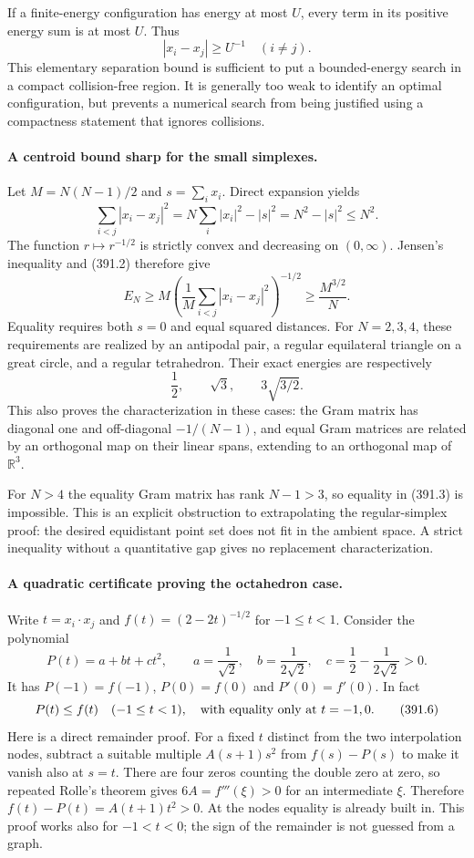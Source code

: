\documentclass[11pt]{article}
\begin{document}
If a finite-energy configuration has energy at most $U$, every term
in its positive energy sum is at most $U$. Thus
\[
 |x_i-x_j|\geq U^{-1}\quad(i\ne j).
 \tag{391.1}
\]
This elementary separation bound is sufficient to put a bounded-energy
search in a compact collision-free region. It is generally too weak
to identify an optimal configuration, but prevents a numerical search
from being justified using a compactness statement that ignores
collisions.

\paragraph{A centroid bound sharp for the small simplexes.}
Let $M=N(N-1)/2$ and $s=\sum_i x_i$. Direct expansion yields
\[
 \sum_{i<j}|x_i-x_j|^2=N\sum_i|x_i|^2-|s|^2=N^2-|s|^2\leq N^2.
 \tag{391.2}
\]
The function $r\mapsto r^{-1/2}$ is strictly convex and decreasing
on $(0,\infty)$. Jensen's inequality and (391.2) therefore give
\[
 E_N\geq M\left(\frac1M\sum_{i<j}|x_i-x_j|^2\right)^{-1/2}
     \geq\frac{M^{3/2}}N.
 \tag{391.3}
\]
Equality requires both $s=0$ and equal squared distances. For
$N=2,3,4$, these requirements are realized by an antipodal pair,
a regular equilateral triangle on a great circle, and a regular
tetrahedron. Their exact energies are respectively
\[
 \frac12,\qquad\sqrt3,\qquad 3\sqrt{3/2}.
 \tag{391.4}
\]
This also proves the characterization in these cases: the Gram matrix
has diagonal one and off-diagonal $-1/(N-1)$, and equal Gram matrices
are related by an orthogonal map on their linear spans, extending to
an orthogonal map of $\mathbb R^3$.

For $N>4$ the equality Gram matrix has rank $N-1>3$, so equality in
(391.3) is impossible. This is an explicit obstruction to extrapolating
the regular-simplex proof: the desired equidistant point set does not
fit in the ambient space. A strict inequality without a quantitative
gap gives no replacement characterization.

\paragraph{A quadratic certificate proving the octahedron case.}
Write $t=x_i\cdot x_j$ and $f(t)=(2-2t)^{-1/2}$ for $-1\leq t<1$.
Consider the polynomial
\[
 P(t)=a+bt+ct^2,\qquad
 a=\frac1{\sqrt2},\quad b=\frac1{2\sqrt2},\quad
 c=\frac12-\frac1{2\sqrt2}>0.
 \tag{391.5}
\]
It has $P(-1)=f(-1)$, $P(0)=f(0)$ and $P'(0)=f'(0)$.
In fact
\[
 P(t)\leq f(t)\quad(-1\leq t<1),
 \quad\hbox{with equality only at }t=-1,0.
 \tag{391.6}
\]
Here is a direct remainder proof. For a fixed $t$ distinct from the
two interpolation nodes, subtract a suitable multiple
$A(s+1)s^2$ from $f(s)-P(s)$ to make it vanish also at $s=t$.
There are four zeros counting the double zero at zero, so repeated
Rolle's theorem gives $6A=f'''(\xi)>0$ for an intermediate $\xi$.
Therefore $f(t)-P(t)=A(t+1)t^2>0$. At the nodes equality is already
built in. This proof works also for $-1<t<0$; the sign of the
remainder is not guessed from a graph.
\end{document}
